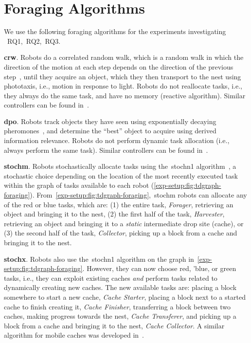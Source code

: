 \section{Foraging Algorithms}\label{exp-setup:sec:foraging-alg}
%
We use the following foraging algorithms for the experiments investigating
~\gls{RQ1},~\gls{RQ2},~\gls{RQ3}.

\textbf{\gls{crw}}. Robots do a correlated random walk, which is a random walk
in which the direction of the motion at each step depends on the direction of
the previous step~\cite{Renshaw1981}, until they acquire an object, which they
then transport to the nest using phototaxis, i.e., motion in response to
light. Robots do not reallocate tasks, i.e., they always do the same task, and
have no memory (reactive algorithm). Similar controllers can be found
in~\cite{Lerman2001,Galstyan2005}.


\textbf{\gls{dpo}}.  Robots track objects they have seen using exponentially
decaying pheromones~\cite{Hecker2015,Harwell2020a}, and determine the ``best''
object to acquire using derived information relevance. Robots do not perform
dynamic task allocation (i.e., always perform the same task). Similar
controllers can be found in~\cite{Talamali2020}.

\textbf{\gls{stochm}}. Robots stochastically allocate tasks using
the~\gls{stochn1} algorithm~\cite{Harwell2020a}, a stochastic choice depending
on the location of the most recently executed task within the graph of tasks
available to each robot
(\cref{exp-setup:fig:tdgraph-foraging}). From~\cref{exp-setup:fig:tdgraph-foraging},~\gls{stochm}
robots can allocate any of the red or blue tasks, which are: (1) the entire
task, \emph{Forager}, retrieving an object and bringing it to the nest, (2) the
first half of the task, \emph{Harvester}, retrieving an object and bringing it
to a \emph{static} intermediate drop site (cache), or (3) the second half of the
task, \emph{Collector}, picking up a block from a cache and bringing it to the
nest.

\textbf{\gls{stochx}}. Robots also use the~\gls{stochn1} algorithm on the graph
in~\cref{exp-setup:fig:tdgraph-foraging}. However, they can now choose red,
'blue, or green tasks, i.e., they can exploit existing caches \emph{and} perform
tasks related to dynamically creating new caches. The new available tasks are:
placing a block somewhere to start a new cache, \emph{Cache Starter}, placing a
block next to a started cache to finish creating it, \emph{Cache Finisher},
transferring a block between two caches, making progress towards the nest,
\emph{Cache Transferer}, and picking up a block from a cache and bringing it to
the nest, \emph{Cache Collector}. A similar algorithm for mobile caches was
developed in~\cite{Lu2020}.

